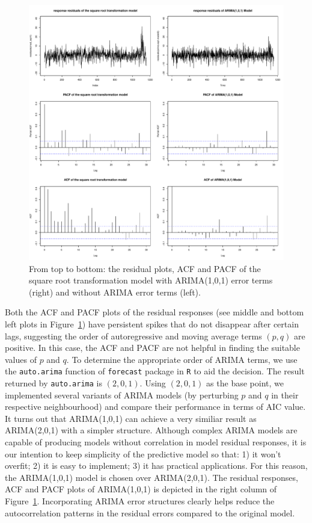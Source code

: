 \documentclass [11pt, proquest] {uwthesis}[2015/03/03]
\begin{document}
\begin{figure}
   \includegraphics[width=1\textwidth]{figures/residual_acfpcf} 
  \caption{From top to bottom: the residual plots, ACF and PACF of the square root transformation model with ARIMA(1,0,1) error terms (right) and without ARIMA error terms (left).}
  \label{fig:residual_acfpcf}
\end{figure}


Both the ACF and PACF plots of the residual responses (see middle and bottom left plots in Figure~\ref{fig:residual_acfpcf}) have persistent spikes that do not disappear after certain lags, suggesting the order of autoregressive and moving average terms $(p,q)$ are positive. In this case, the ACF and PACF are not helpful in finding the suitable values of $p$ and $q$. To determine the appropriate order of ARIMA terms, we use the \texttt{auto.arima} function of \texttt{forecast} package in \texttt{R} to aid the decision. The result returned by \texttt{auto.arima} is $(2,0,1)$. Using $(2,0,1)$ as the base point, we implemented several variants of ARIMA models (by perturbing $p$ and $q$ in their respective neighbourhood) and compare their performance in terms of AIC value. It turns out that ARIMA(1,0,1) can achieve a very similiar result as ARIMA(2,0,1) with a simpler structure. Although complex ARIMA models are capable of producing models without correlation in model residual responses, it is our intention to keep simplicity of the predictive model so that: 1) it won't overfit; 2) it is easy to implement; 3) it has practical applications. For this reason, the ARIMA(1,0,1) model is chosen over ARIMA(2,0,1). The residual responses, ACF and PACF plots of ARIMA(1,0,1) is depicted in the right column of Figure~\ref{fig:residual_acfpcf}. Incorporating ARIMA error structures clearly helps reduce the autocorrelation patterns in the residual errors compared to the original model.
 
\end{document}

